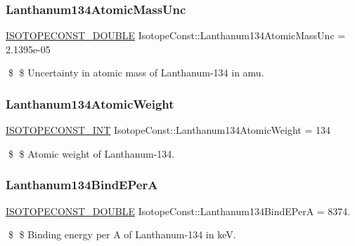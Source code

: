 \subsubsection{\texorpdfstring{Lanthanum134\+Atomic\+Mass\+Unc}{Lanthanum134AtomicMassUnc}}
{\footnotesize\ttfamily \mbox{\hyperlink{group___isotope_const-_macros_ga8f45a7272ce02c0b4c65c44636ed719a}{I\+S\+O\+T\+O\+P\+E\+C\+O\+N\+S\+T\+\_\+\+D\+O\+U\+B\+LE}} Isotope\+Const\+::\+Lanthanum134\+Atomic\+Mass\+Unc = 2.\+1395e-\/05}

\$ \$ Uncertainty in atomic mass of Lanthanum-\/134 in amu. \mbox{\label{group___isotope_const-_lanthanum-_la134_ga0b779f1998ece4d2306453d58e99896b}} 
\subsubsection{\texorpdfstring{Lanthanum134\+Atomic\+Weight}{Lanthanum134AtomicWeight}}
{\footnotesize\ttfamily \mbox{\hyperlink{group___isotope_const-_macros_ga5f18360b3e99483a35c32d789e62621c}{I\+S\+O\+T\+O\+P\+E\+C\+O\+N\+S\+T\+\_\+\+I\+NT}} Isotope\+Const\+::\+Lanthanum134\+Atomic\+Weight = 134}

\$ \$ Atomic weight of Lanthanum-\/134. \mbox{\label{group___isotope_const-_lanthanum-_la134_gae8e43f5eae5fbc576dce6c2567d1369f}} 
\subsubsection{\texorpdfstring{Lanthanum134\+Bind\+E\+PerA}{Lanthanum134BindEPerA}}
{\footnotesize\ttfamily \mbox{\hyperlink{group___isotope_const-_macros_ga8f45a7272ce02c0b4c65c44636ed719a}{I\+S\+O\+T\+O\+P\+E\+C\+O\+N\+S\+T\+\_\+\+D\+O\+U\+B\+LE}} Isotope\+Const\+::\+Lanthanum134\+Bind\+E\+PerA = 8374.}

\$ \$ Binding energy per A of Lanthanum-\/134 in keV. \mbox{\label{group___isotope_const-_lanthanum-_la134_gaf271dd8728e41ce7823dfe45f3307f3e}} 
